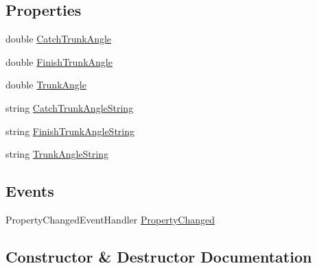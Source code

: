 \subsection*{Properties}
\begin{DoxyCompactItemize}
\item 
double \hyperlink{class_rowing_monitor_1_1_view_model_1_1_trunk_angle_view_model_a64fc2e1372e05c65cd17f24a142f2783}{Catch\+Trunk\+Angle}
\item 
double \hyperlink{class_rowing_monitor_1_1_view_model_1_1_trunk_angle_view_model_a2eeeab2ed9f562381aff8e7d8f8e19c6}{Finish\+Trunk\+Angle}
\item 
double \hyperlink{class_rowing_monitor_1_1_view_model_1_1_trunk_angle_view_model_af5df9632377df43618457ce9743e2793}{Trunk\+Angle}
\item 
string \hyperlink{class_rowing_monitor_1_1_view_model_1_1_trunk_angle_view_model_a696475d48415b0f2d9574d9189eac534}{Catch\+Trunk\+Angle\+String}
\item 
string \hyperlink{class_rowing_monitor_1_1_view_model_1_1_trunk_angle_view_model_a655f421edb6375f54ae79af3207014cd}{Finish\+Trunk\+Angle\+String}
\item 
string \hyperlink{class_rowing_monitor_1_1_view_model_1_1_trunk_angle_view_model_adfd95524f3e943d219f72ffee09a9040}{Trunk\+Angle\+String}
\end{DoxyCompactItemize}
\subsection*{Events}
\begin{DoxyCompactItemize}
\item 
Property\+Changed\+Event\+Handler \hyperlink{class_rowing_monitor_1_1_view_model_1_1_trunk_angle_view_model_afbf525541d69036a9e40d427d08084c1}{Property\+Changed}
\end{DoxyCompactItemize}


\subsection{Constructor \& Destructor Documentation}
\mbox{\label{class_rowing_monitor_1_1_view_model_1_1_trunk_angle_view_model_a66b6cf452c62d64c865b7fdda61edbcb}} 
